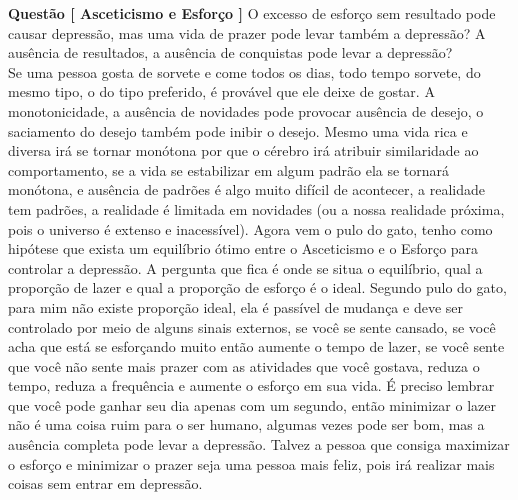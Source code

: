 \textbf{Questão [ Asceticismo e Esforço ]} O excesso de esforço sem resultado pode causar depressão, mas uma vida de prazer pode levar também a depressão? A ausência de resultados, a ausência de conquistas pode levar a depressão?\\

Se uma pessoa gosta de sorvete e come todos os dias, todo tempo sorvete, do mesmo tipo, o do tipo preferido, é provável que ele deixe de gostar. A monotonicidade, a ausência de novidades pode provocar ausência de desejo, o saciamento do desejo também pode inibir o desejo. Mesmo uma vida rica e diversa irá se tornar monótona por que o cérebro irá atribuir similaridade ao comportamento, se a vida se estabilizar em algum padrão ela se tornará monótona, e ausência de padrões é algo muito difícil de acontecer, a realidade tem padrões, a realidade é limitada em novidades (ou a nossa realidade próxima, pois o universo é extenso e inacessível). 
Agora vem o pulo do gato, tenho como hipótese que exista um equilíbrio ótimo entre o Asceticismo e o Esforço para controlar a depressão. A pergunta que fica é onde se situa o equilíbrio, qual a proporção de lazer e qual a proporção de esforço é o ideal. Segundo pulo do gato, para mim não existe proporção ideal, ela é passível de mudança e deve ser controlado por meio de alguns sinais externos, se você se sente cansado, se você acha que está se esforçando muito então aumente o tempo de lazer, se você sente que você não sente mais prazer com as atividades que você gostava, reduza o tempo, reduza a frequência e aumente o esforço em sua vida. É preciso lembrar que você pode ganhar seu dia apenas com um segundo, então minimizar o lazer não é uma coisa ruim para o ser humano, algumas vezes pode ser bom, mas a ausência completa pode levar a depressão. Talvez a pessoa que consiga maximizar o esforço e minimizar o prazer seja uma pessoa mais feliz, pois irá realizar mais coisas sem entrar em depressão.\\

